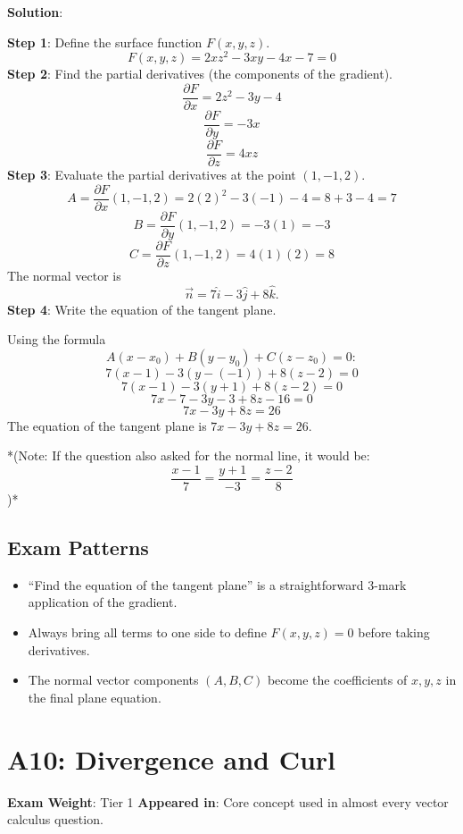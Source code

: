 \documentclass[
]{article}
\providecommand{\tightlist}{%
  \setlength{\itemsep}{0pt}\setlength{\parskip}{0pt}}
\renewenvironment{quote}
  {\begin{tcolorbox}[
     colback=calloutbg,
     colframe=calloutframe,
     colupper=callouttext,
     arc=3pt,
     boxrule=0.5pt,
     leftrule=0.5pt,
     borderline west={3pt}{0pt}{calloutaccent},
     left=8pt,
     right=8pt,
     top=6pt,
     bottom=6pt
   ]}
  {\end{tcolorbox}}
\begin{document}
\textbf{Solution}:

\textbf{Step 1}: Define the surface function \(F(x, y, z)\).
\[
F(x, y, z) = 2xz^2 - 3xy - 4x - 7 = 0
\]
\textbf{Step 2}: Find the partial derivatives (the components of the
gradient).
\[
\frac{\partial F}{\partial x} = 2z^2 - 3y - 4
\]
\[
\frac{\partial F}{\partial y} = -3x
\]
\[
\frac{\partial F}{\partial z} = 4xz
\]
\textbf{Step 3}: Evaluate the partial derivatives at the point
\((1, -1, 2)\).
\[
A = \frac{\partial F}{\partial x}(1, -1, 2) = 2(2)^2 - 3(-1) - 4 = 8 + 3 - 4 = 7
\]
\[
B = \frac{\partial F}{\partial y}(1, -1, 2) = -3(1) = -3
\]
\[
C = \frac{\partial F}{\partial z}(1, -1, 2) = 4(1)(2) = 8
\]
The normal vector is
\[
\vec{n} = 7\hat{i} - 3\hat{j} + 8\hat{k}.
\]
\textbf{Step 4}: Write the equation of the tangent plane.

Using the formula
\[
A(x - x_0) + B(y - y_0) + C(z - z_0) = 0:
\]
\[
7(x - 1) - 3(y - (-1)) + 8(z - 2) = 0
\]
\[
7(x - 1) - 3(y + 1) + 8(z - 2) = 0
\]
\[
7x - 7 - 3y - 3 + 8z - 16 = 0
\]
\[
7x - 3y + 8z = 26
\]
The equation of the tangent plane is \(7x - 3y + 8z = 26\).

*(Note: If the question also asked for the normal line, it would be:
\[
\frac{x-1}{7} = \frac{y+1}{-3} = \frac{z-2}{8}
\]
)*

\subsection{Exam Patterns}\label{exam-patterns-8}

\begin{itemize}
\tightlist
\item
  ``Find the equation of the tangent plane'' is a straightforward 3-mark
  application of the gradient.
\item
  Always bring all terms to one side to define \(F(x, y, z) = 0\) before
  taking derivatives.
\item
  The normal vector components \((A, B, C)\) become the coefficients of
  \(x, y, z\) in the final plane equation.
\end{itemize}

\section{A10: Divergence and Curl}\label{a10-divergence-and-curl}

\begin{quote}
\textbf{Exam Weight}: Tier 1 \textbar{} \textbf{Appeared in}: Core
concept used in almost every vector calculus question.
\end{quote}
\end{document}
